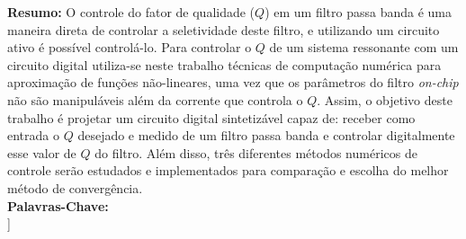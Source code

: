 	\textbf{Resumo:} 
	O controle do fator de qualidade ($Q$) em um filtro passa banda é uma maneira direta de controlar a seletividade deste filtro, e utilizando um circuito ativo é possível controlá-lo. Para controlar o $Q$ de um sistema ressonante com um circuito digital utiliza-se neste trabalho técnicas de computação numérica para aproximação de funções não-lineares, uma vez que os parâmetros do filtro \textit{on-chip} não são manipuláveis além da corrente que controla o $Q$. Assim, o objetivo deste trabalho é projetar um circuito digital sintetizável capaz de: receber como entrada o $Q$  desejado e medido de um filtro passa banda e controlar digitalmente esse valor de $Q$ do filtro. Além disso, três diferentes métodos numéricos de controle serão estudados e implementados para comparação e escolha do melhor método de convergência. \\
	\textbf{Palavras-Chave:}\\
]


 
 



 

